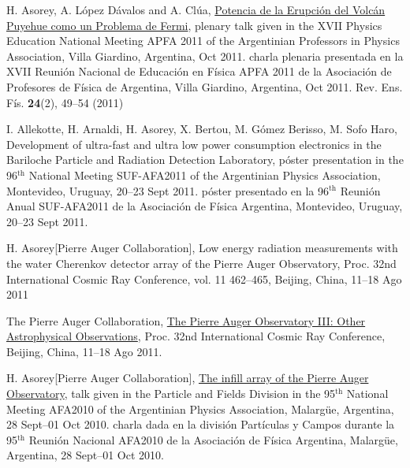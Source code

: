 \begin{etaremune}
\item {}H. Asorey, A. López Dávalos and A. Clúa, \href{https://dialnet.unirioja.es/servlet/articulo?codigo=4026852}{{Potencia de la Erupción del Volcán Puyehue como un Problema de Fermi}},
\ifeng
plenary talk given in the XVII Physics Education National Meeting APFA 2011 of the Argentinian Professors in Physics Association, Villa Giardino, Argentina, Oct 2011.
\else
charla plenaria presentada en la XVII Reunión Nacional de Educación en Física APFA 2011 de la Asociación de Profesores de Física de Argentina, Villa Giardino, Argentina, Oct 2011.
\fi
Rev.
Ens.
Fís. {\textbf{24}}(2), 49--54 (2011)

\item {}I. Allekotte, H. Arnaldi, H. Asorey, X. Bertou, M. Gómez Berisso,
M. Sofo Haro, {{Development of ultra-fast and ultra low power consumption
electronics in the Bariloche Particle and Radiation Detection Laboratory}},
\ifeng
póster presentation in the 96$^{\mathrm{th}}$ National Meeting SUF-AFA2011 of the Argentinian Physics Association, Montevideo, Uruguay, 20--23 Sept 2011.
\else
póster presentado en la 96$^{\mathrm{th}}$ Reunión Anual SUF-AFA2011 de la Asociación de Física Argentina, Montevideo, Uruguay, 20--23 Sept 2011.
\fi

\item {}H. Asorey[Pierre Auger Collaboration], {{Low energy radiation
measurements with the water Cherenkov detector array of the Pierre Auger
Observatory}}, \en Proc.
32nd International Cosmic Ray Conference, vol.
11
462--465, Beijing, China, 11--18 Ago 2011

\item {}The Pierre Auger Collaboration,
\href{http://arxiv.org/abs/1107.4805}{{The Pierre Auger Observatory III:
Other Astrophysical Observations}}, \en Proc.
32nd International Cosmic Ray
Conference, Beijing, China, 11--18 Ago 2011.

\item {}H. Asorey[Pierre Auger Collaboration],
\href{http://95rnf.afa.webfactional.com/tex\_files/Resumenes/DPyC/PyC\_6.pdf}{{The
infill array of the Pierre Auger Observatory}}, 
\ifeng
talk given in the Particle and Fields Division in the 95$^{\mathrm{th}}$ National Meeting AFA2010 of the Argentinian Physics Association, Malargüe, Argentina, 28 Sept--01 Oct 2010.
\else
charla dada en la división Partículas y Campos durante la 95$^{\mathrm{th}}$ Reunión Nacional AFA2010 de la Asociación de Física Argentina, Malargüe, Argentina, 28 Sept--01 Oct 2010.
\fi


\end{etaremune}
